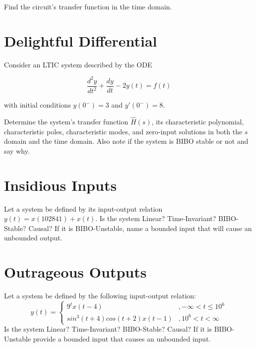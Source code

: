 \documentclass{article}
\begin{document}
Find the circuit's transfer function in the time domain.
\newpage

\section{Delightful Differential}

Consider an LTIC system described by the ODE

$$\frac{d^2y}{dt^2}+\frac{dy}{dt}-2y(t) = f(t)$$

with initial conditions $y(0^-) = 3$ and $y'(0^-) = 8$.

Determine the system's transfer function $\hat{H}(s)$, its characteristic polynomial, characteristic poles, characteristic modes, and zero-input solutions in both the $s$ domain and the time domain. Also note if the system is BIBO stable or not and say why.

\vfill

\section{Insidious Inputs}

Let a system be defined by its input-output relation $y(t) = x(102841) + x(t)$. Is the system Linear? Time-Invariant? BIBO-Stable? Causal? If it is BIBO-Unstable, name a bounded input that will cause an unbounded output.

\vfill

\section{Outrageous Outputs}

Let a system be defined by the following input-output relation:
$$y(t) =
    \begin{cases}
      9^t x(t-4) & , -\infty < t \leq 10^6\\
      sin^3(t+4) cos(t+2) x(t-1) & , 10^6 < t < \infty
    \end{cases}$$    
Is the system Linear? Time-Invariant? BIBO-Stable? Causal? If it is BIBO-Unstable provide a bounded input that causes an unbounded input.

\vfill

\newpage


\end{document}
